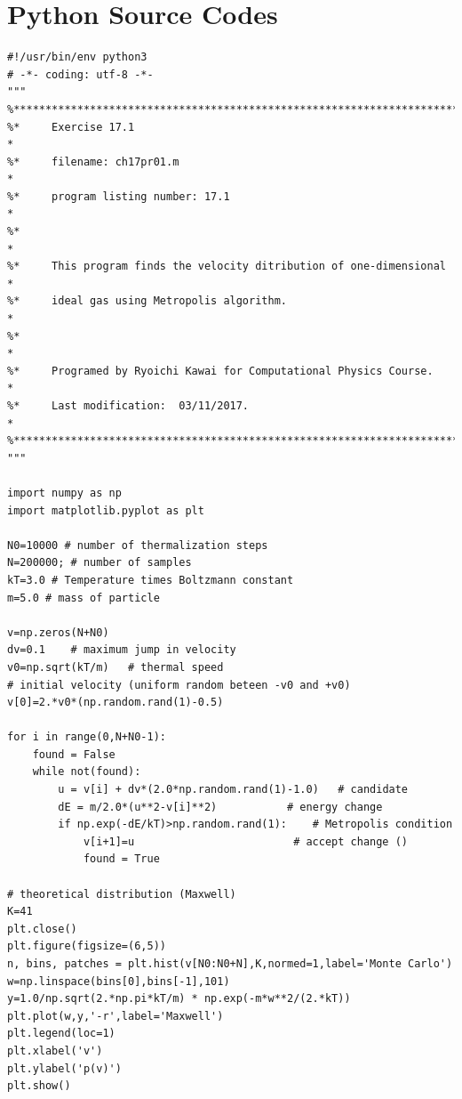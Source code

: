 
\bigskip
\noindent
\section*{Python Source Codes}
\setcounter{program}{0}

\bigskip
\noindent
\program
\footnotesize
\begin{verbatim}
#!/usr/bin/env python3
# -*- coding: utf-8 -*-
"""
%**************************************************************************
%*     Exercise 17.1                                                      *
%*     filename: ch17pr01.m                                               *
%*     program listing number: 17.1                                       *
%*                                                                        *
%*     This program finds the velocity ditribution of one-dimensional     *
%*     ideal gas using Metropolis algorithm.                              *
%*                                                                        *
%*     Programed by Ryoichi Kawai for Computational Physics Course.       *
%*     Last modification:  03/11/2017.                                    *
%**************************************************************************
"""

import numpy as np
import matplotlib.pyplot as plt

N0=10000 # number of thermalization steps
N=200000; # number of samples
kT=3.0 # Temperature times Boltzmann constant
m=5.0 # mass of particle

v=np.zeros(N+N0)
dv=0.1    # maximum jump in velocity
v0=np.sqrt(kT/m)   # thermal speed
# initial velocity (uniform random beteen -v0 and +v0)
v[0]=2.*v0*(np.random.rand(1)-0.5)  

for i in range(0,N+N0-1):
    found = False
    while not(found):
        u = v[i] + dv*(2.0*np.random.rand(1)-1.0)   # candidate
        dE = m/2.0*(u**2-v[i]**2)           # energy change
        if np.exp(-dE/kT)>np.random.rand(1):    # Metropolis condition
            v[i+1]=u                         # accept change ()
            found = True

# theoretical distribution (Maxwell)
K=41
plt.close()
plt.figure(figsize=(6,5))
n, bins, patches = plt.hist(v[N0:N0+N],K,normed=1,label='Monte Carlo')
w=np.linspace(bins[0],bins[-1],101)
y=1.0/np.sqrt(2.*np.pi*kT/m) * np.exp(-m*w**2/(2.*kT))
plt.plot(w,y,'-r',label='Maxwell')
plt.legend(loc=1)
plt.xlabel('v')
plt.ylabel('p(v)')
plt.show()
\end{verbatim}
\normalsize

